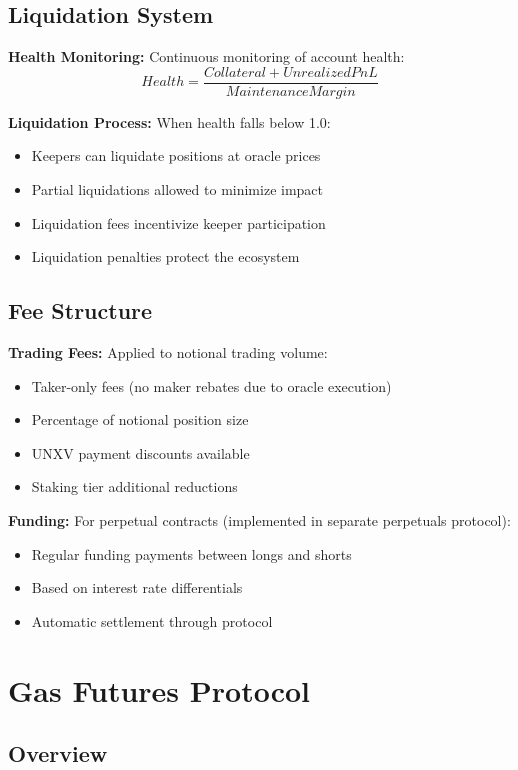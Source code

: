\documentclass[12pt]{article}
\begin{document}
\subsection{Liquidation System}

\textbf{Health Monitoring:} Continuous monitoring of account health:
$$Health = \frac{Collateral + UnrealizedPnL}{MaintenanceMargin}$$

\textbf{Liquidation Process:} When health falls below 1.0:
\begin{itemize}
    \item Keepers can liquidate positions at oracle prices
    \item Partial liquidations allowed to minimize impact
    \item Liquidation fees incentivize keeper participation
    \item Liquidation penalties protect the ecosystem
\end{itemize}

\subsection{Fee Structure}

\textbf{Trading Fees:} Applied to notional trading volume:
\begin{itemize}
    \item Taker-only fees (no maker rebates due to oracle execution)
    \item Percentage of notional position size
    \item UNXV payment discounts available
    \item Staking tier additional reductions
\end{itemize}

\textbf{Funding:} For perpetual contracts (implemented in separate perpetuals protocol):
\begin{itemize}
    \item Regular funding payments between longs and shorts
    \item Based on interest rate differentials
    \item Automatic settlement through protocol
\end{itemize}

\section{Gas Futures Protocol}

\subsection{Overview}
\end{document}
